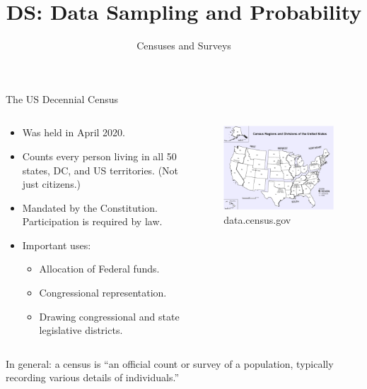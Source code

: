 \documentclass[aspectratio=169]{../latex_main/tntbeamer}  %
\title[Introduction]{DS: Data Sampling and Probability}
\subtitle{Censuses and Surveys}
\begin{document}
	
	\maketitle
	
	\begin{frame}{The US Decennial Census}
	     \begin{columns}
	         \begin{column}{.4\textwidth}
	         \begin{itemize}
	             \item Was held in April 2020.
	             \item Counts every person living in all 50 states, DC, and US territories. (Not just citizens.)
	             \item Mandated by the Constitution. Participation is required by law.
	             \item Important uses:
	             \begin{itemize}
	                 \item Allocation of Federal funds.
	                 \item Congressional representation.
	                 \item Drawing congressional and state legislative districts.
	             \end{itemize}
	         \end{itemize}
	         

	         \end{column}
	         \begin{column}{.4\textwidth}
	                \begin{figure}
	                    \centering
	                    \includegraphics[scale=.5]{Bild6}
	                    \caption{data.census.gov}
	                \end{figure}
	                

	         \end{column}
	         
	         
	         
	     \end{columns}
	     In general: a census is “an official count or survey of a population, typically recording various details of individuals.”
	\end{frame}
	
\end{document}

